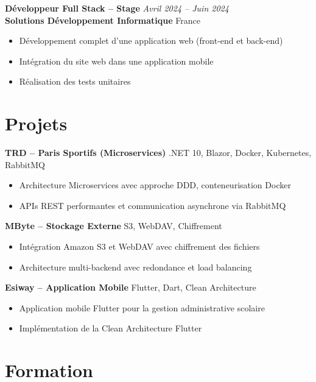 \documentclass[a4paper,10pt]{article}
\begin{document}
\vspace{0.3em}

\textbf{Développeur Full Stack -- Stage} \hfill \textit{Avril 2024 -- Juin 2024} \\
\textbf{Solutions Développement Informatique} \hfill France
\begin{itemize}
    \item Développement complet d'une application web (front-end et back-end)
    \item Intégration du site web dans une application mobile
    \item Réalisation des tests unitaires
\end{itemize}

\section{Projets}

\textbf{TRD -- Paris Sportifs (Microservices)} \hfill .NET 10, Blazor, Docker, Kubernetes, RabbitMQ
\begin{itemize}
    \item Architecture Microservices avec approche DDD, conteneurisation Docker
    \item APIs REST performantes et communication asynchrone via RabbitMQ
\end{itemize}

\textbf{MByte -- Stockage Externe} \hfill S3, WebDAV, Chiffrement
\begin{itemize}
    \item Intégration Amazon S3 et WebDAV avec chiffrement des fichiers
    \item Architecture multi-backend avec redondance et load balancing
\end{itemize}

\textbf{Esiway -- Application Mobile} \hfill Flutter, Dart, Clean Architecture
\begin{itemize}
    \item Application mobile Flutter pour la gestion administrative scolaire
    \item Implémentation de la Clean Architecture Flutter
\end{itemize}

\section{Formation}
\end{document}
